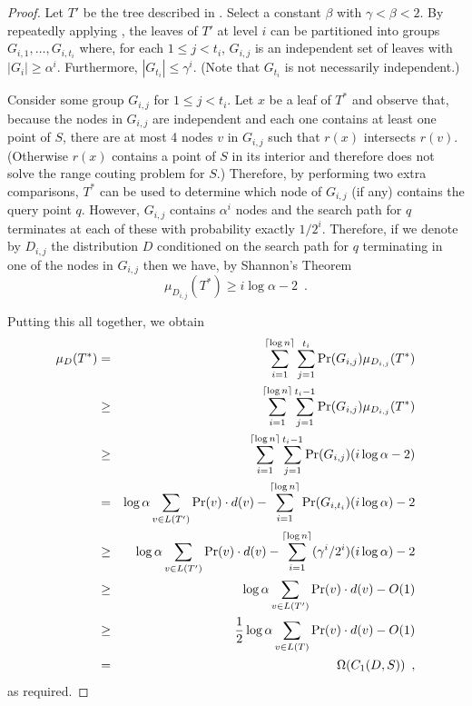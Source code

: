 \documentclass[lotsofwhite,charterfonts]{patmorin}
\newcommand{\depth}{d}
\newcommand{\leaves}{L}
\begin{document}
\begin{proof}
Let $T'$ be the tree described in .
Select a constant $\beta$ with $\gamma < \beta < 2$.  By repeatedly
applying , the leaves of $T'$ at level $i$ can be
partitioned into groups $G_{i,1},\ldots,G_{i,t_i}$ where, for each $1
\le j < t_i$, $G_{i,j}$ is an independent set of leaves with $|G_i| \ge
\alpha^i$.  Furthermore, $|G_{t_i}| \le \gamma^i$. (Note that
$G_{t_i}$ is not necessarily independent.)

Consider some group $G_{i,j}$ for $1\le j < t_i$.  Let $x$ be a leaf
of $T^*$ and observe that, because the nodes in $G_{i,j}$ are
independent and each one contains at least one point of $S$, there are
at most 4 nodes $v$ in $G_{i,j}$ such that $r(x)$ intersects $r(v)$.
(Otherwise $r(x)$ contains a point of $S$ in its interior and
therefore does not solve the range couting problem for $S$.)
Therefore, by performing two extra comparisons, $T^*$ can be used to
determine which node of $G_{i,j}$ (if any) contains the query point
$q$.  However, $G_{i,j}$ contains $\alpha^i$ nodes and the search path
for $q$ terminates at each of these with probability exactly $1/2^i$.
Therefore, if we denote by $D_{i,j}$ the distribution $D$ conditioned
on the search path for $q$ terminating in one of the nodes in
$G_{i,j}$ then we have, by Shannon's Theorem
\[
   \mu_{D_{i,j}}(T^*) \ge i\log\alpha - 2 \enspace .
\]

Putting this all together, we obtain
\begin{eqnarray*}
\mu_D(T^*) 
  & = & \sum_{i=1}^{\ceil{\log n}}\sum_{j=1}^{t_i}\Pr(G_{i,j})\mu_{D_{i,j}}(T^*) \\
  & \ge & \sum_{i=1}^{\ceil{\log n}}
    \sum_{j=1}^{t_i-1}\Pr(G_{i,j})\mu_{D_{i,j}}(T^*) \\
  & \ge & \sum_{i=1}^{\ceil{\log n}}\sum_{j=1}^{t_i-1}\Pr(G_{i,j})( i\log\alpha -2) \\
  & = & \log\alpha \sum_{v\in\leaves(T')}\Pr(v)\cdot \depth(v)
          -    \sum_{i=1}^{\ceil{\log n}}\Pr(G_{i,t_i})(i\log\alpha) - 2 \\
  & \ge & \log\alpha \sum_{v\in\leaves(T')}\Pr(v)\cdot \depth(v)
          -    \sum_{i=1}^{\ceil{\log n}}(\gamma^i/2^i)(i\log\alpha) - 2 \\
  & \ge & \log\alpha \sum_{v\in\leaves(T')}\Pr(v)\cdot \depth(v) - O(1) \\
  & \ge & \frac{1}{2}\log\alpha \sum_{v\in\leaves(T)}\Pr(v)\cdot\depth(v) - O(1) \\
  & = & \Omega(C_1(D,S)) \enspace ,
\end{eqnarray*}
as required.
\end{proof}
\end{document}
